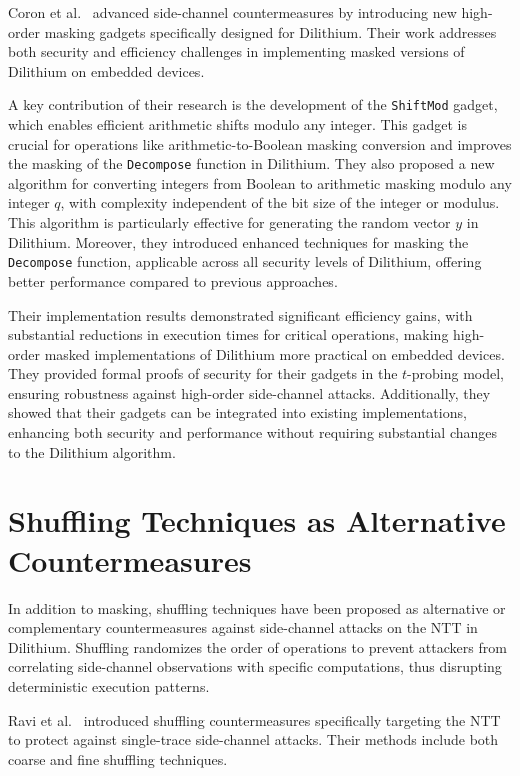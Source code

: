 Coron et al.~\cite{Coron23} advanced side-channel countermeasures by introducing new high-order masking gadgets specifically designed for Dilithium. Their work addresses both security and efficiency challenges in implementing masked versions of Dilithium on embedded devices.

A key contribution of their research is the development of the \texttt{ShiftMod} gadget, which enables efficient arithmetic shifts modulo any integer. This gadget is crucial for operations like arithmetic-to-Boolean masking conversion and improves the masking of the \texttt{Decompose} function in Dilithium. They also proposed a new algorithm for converting integers from Boolean to arithmetic masking modulo any integer $q$, with complexity independent of the bit size of the integer or modulus. This algorithm is particularly effective for generating the random vector $y$ in Dilithium. Moreover, they introduced enhanced techniques for masking the \texttt{Decompose} function, applicable across all security levels of Dilithium, offering better performance compared to previous approaches.

Their implementation results demonstrated significant efficiency gains, with substantial reductions in execution times for critical operations, making high-order masked implementations of Dilithium more practical on embedded devices. They provided formal proofs of security for their gadgets in the $t$-probing model, ensuring robustness against high-order side-channel attacks. Additionally, they showed that their gadgets can be integrated into existing implementations, enhancing both security and performance without requiring substantial changes to the Dilithium algorithm.


\section{Shuffling Techniques as Alternative Countermeasures}

In addition to masking, shuffling techniques have been proposed as alternative or complementary countermeasures against side-channel attacks on the \ac{NTT} in Dilithium. Shuffling randomizes the order of operations to prevent attackers from correlating side-channel observations with specific computations, thus disrupting deterministic execution patterns.

Ravi et al.~\cite{Ravi20} introduced shuffling countermeasures specifically targeting the \ac{NTT} to protect against single-trace side-channel attacks. Their methods include both coarse and fine shuffling techniques.


